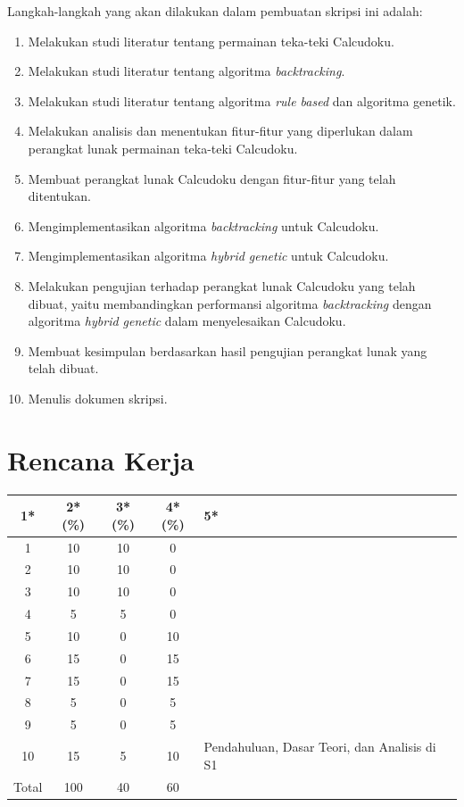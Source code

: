 \documentclass[a4paper,twoside]{article}
\begin{document}
Langkah-langkah yang akan dilakukan dalam pembuatan skripsi ini adalah:
\begin{enumerate}
\item Melakukan studi literatur tentang permainan teka-teki Calcudoku.
\item Melakukan studi literatur tentang algoritma \textit{backtracking}.
\item Melakukan studi literatur tentang algoritma \textit{rule based} dan algoritma genetik.
\item Melakukan analisis dan menentukan fitur-fitur yang diperlukan dalam perangkat lunak permainan teka-teki Calcudoku.
\item Membuat perangkat lunak Calcudoku dengan fitur-fitur yang telah ditentukan. 
\item Mengimplementasikan algoritma \textit{backtracking} untuk Calcudoku.
\item Mengimplementasikan algoritma \textit{hybrid genetic} untuk Calcudoku.
\item Melakukan pengujian terhadap perangkat lunak Calcudoku yang telah dibuat, yaitu membandingkan performansi algoritma \textit{backtracking} dengan algoritma \textit{hybrid genetic} dalam menyelesaikan Calcudoku.
\item Membuat kesimpulan berdasarkan hasil pengujian perangkat lunak yang telah dibuat.
\item Menulis dokumen skripsi.
\end{enumerate}

\section{Rencana Kerja}

\begin{center}
  \begin{tabular}{ | c | c | c | c | l |}
    \hline
    1* & 2*(\%) & 3*(\%) & 4*(\%) & 5* \\ \hline \hline
    1 & 10 & 10 & 0 & \\ \hline
    2 & 10 & 10 & 0 & \\ \hline
    3 & 10 & 10 & 0 & \\ \hline
    4 & 5 & 5 & 0 & \\ \hline
    5 & 10 & 0 & 10 & \\ \hline
    6 & 15 & 0 & 15 & \\ \hline
    7 & 15 & 0 & 15 & \\ \hline
    8 & 5 & 0 & 5 & \\ \hline
    9 & 5 & 0 & 5 & \\ \hline
    10 & 15 & 5 & 10 & {\footnotesize Pendahuluan, Dasar Teori, dan Analisis di S1} \\ \hline
    Total & 100 & 40 & 60 & \\ \hline
	\end{tabular}
\end{center}
\end{document}
